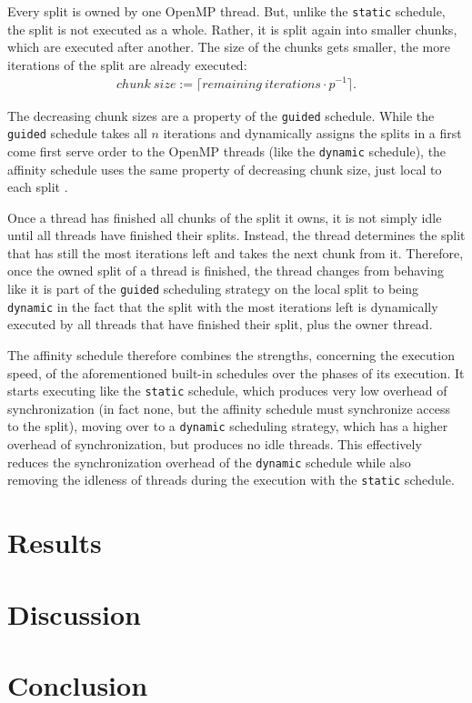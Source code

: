 \documentclass[twoside,11pt]{article}
\begin{document}
Every split is owned by one OpenMP thread. But, unlike the
\texttt{static} schedule, the split is not executed as a
whole.
Rather, it is split again into smaller chunks, which are
executed after another.
The size of the chunks gets smaller, the more iterations
of the split are already executed:
\begin{align*}
  chunk\ size := \lceil remaining\ iterations \cdot p^{-1} \rceil.
\end{align*}

The decreasing chunk sizes are a property of the
\texttt{guided} schedule.
While the \texttt{guided} schedule takes all $n$ iterations
and dynamically assigns the splits in a first come first
serve order to the OpenMP threads (like the
\texttt{dynamic} schedule), the affinity schedule
uses the same property of decreasing chunk size, just local
to each split \citep[see][Chapter 2]{omp}.

Once a thread has finished all chunks of the split it owns,
it is not simply idle until all threads have finished their
splits.
Instead, the thread determines the split that has still the
most iterations left and takes the next chunk from it.
Therefore, once the owned split of a thread is finished,
the thread changes from behaving like it is part of the
\texttt{guided} scheduling strategy on the local split to
being \texttt{dynamic} in the fact that the split with the
most iterations left is dynamically executed by all threads
that have finished their split, plus the owner thread.

The affinity schedule therefore combines the strengths,
concerning the execution speed, of the aforementioned
built-in schedules over the phases of its execution.
It starts executing like the \texttt{static} schedule,
which produces very low overhead of synchronization (in
fact none, but the affinity schedule must synchronize
access to the split), moving over to a \texttt{dynamic}
scheduling strategy,
which has a higher overhead of synchronization, but
produces no idle threads.
This effectively reduces the synchronization overhead of
the \texttt{dynamic} schedule while also removing the
idleness of threads during the execution with the
\texttt{static} schedule.




%


\section{Results} %


\section{Discussion} %


\section{Conclusion} %



\end{document}
